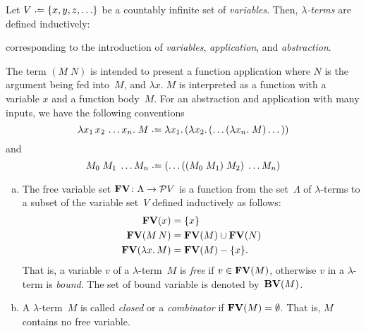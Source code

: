 \begin{definition}[Syntax]
  Let $V \defeq \{ x, y, z, \ldots \}$ be a countably infinite set of
  \emph{variables}.  Then, \emph{$\lambda$-terms} are defined inductively:
  \begin{multicols}{3}
    \begin{prooftree}
    \end{prooftree}
    \columnbreak
    \begin{prooftree}
    \end{prooftree}
    \columnbreak
    \begin{prooftree}
    \end{prooftree}
  \end{multicols}
  \noindent corresponding to the introduction of \emph{variables},
  \emph{application}, and \emph{abstraction}.
\end{definition}
The term $(M\;N)$ is intended to present a function application where $N$ is the
argument being fed into~$M$, and $\lambda x.\; M$ is interpreted as a function
with a variable $x$ and a function body~$M$. For an abstraction and
application with many inputs, we have the following conventions
\[
  \lambda x_1\,x_2\,\dots x_n.\; M
  \defeq \lambda x_1.\,(\lambda x_2.\, (\dots (\lambda x_n.\; M)\dots))
\]
and
\[
  M_0\;M_1\;\dots M_n \defeq (\dots ((M_0\;M_1)\;M_2)\;\dots M_n)
\]
\begin{definition}
  \begin{enumerate}[(a)]
    \item The free variable set $\FV\colon \Lambda \to \mathcal{P}V$ is a function from the
      set~$\Lambda$ of $\lambda$-terms to a subset of the variable set~$V$ defined
      inductively as follows:
      \begin{align*}
        \FV(x) & = \{ x \} \\
        \FV(M\, N) & = \FV(M) \cup \FV(N) \\
        \FV(\lambda x.\, M) & = \FV(M) - \{ x \}.
      \end{align*}
      That is, a variable $v$ of a $\lambda$-term~$M$ is \emph{free} if $v \in
      \FV(M)$, otherwise $v$ in a $\lambda$-term is
      \emph{bound}. The set of bound variable is denoted by~$\BV(M)$.
    \item A $\lambda$-term~$M$ is called \emph{closed} or a \emph{combinator} if
      $\FV(M) = \emptyset$. That
      is, $M$ contains no free variable.
  \end{enumerate}
\end{definition}

